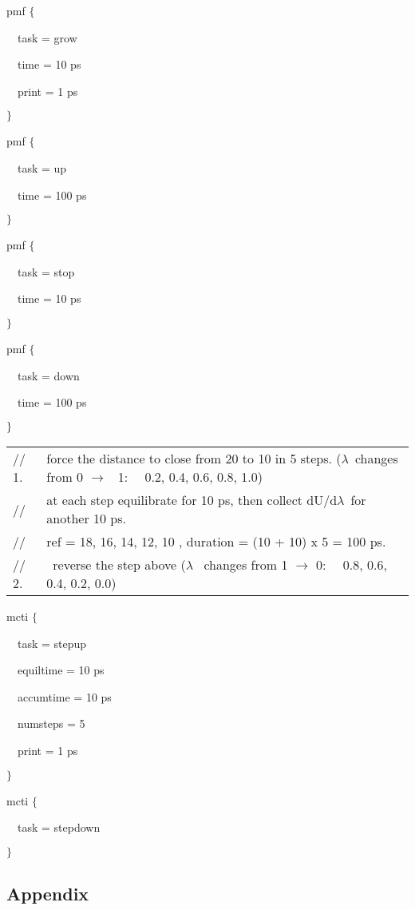 pmf $\{$

~~task = grow

~~time = 10 ps

~~print = 1 ps

$\}$

pmf $\{$

~~task = up

~~time = 100 ps

$\}$

pmf $\{$

~~task = stop

~~time = 10 ps

$\}$

pmf $\{$

~~task = down

~~time = 100 ps

$\}\medskip $

\begin{tabular}{ll}
{\footnotesize // 1. } & {\footnotesize force the distance to close from 20 
to 10 %
in 5 steps. (}$\lambda ${\footnotesize \ changes from 0 }$\rightarrow $%
{\footnotesize \ 1: ~~0.2, 0.4, 0.6, 0.8, 1.0)} \\ 
{\footnotesize // } & {\footnotesize at each step equilibrate for 10 ps,
then collect dU/d}$\lambda ${\footnotesize \ for another 10 ps.} \\ 
{\footnotesize //} & {\footnotesize ref = 18, 16, 14, 12, 10 
, duration = (10 + 10) x 5 = 100 ps.} \\ 
{\footnotesize // 2.} & {\footnotesize \ reverse the step above (}$\lambda $%
{\footnotesize \ changes from 1 }$\rightarrow $ {\footnotesize 0: ~~0.8,
0.6, 0.4, 0.2, 0.0)}
\end{tabular}

mcti $\{$

~~task = stepup

~~equiltime = 10 ps

~~accumtime = 10 ps

~~numsteps = 5

~~print = 1 ps

$\}$

mcti $\{$

~~task = stepdown

$\}$\pagebreak

\subsection{Appendix}

